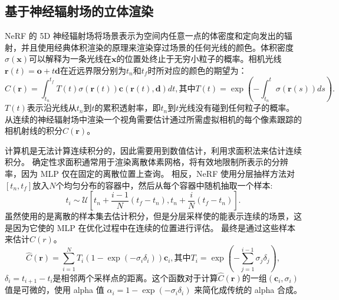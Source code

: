 \subsection{基于神经辐射场的立体渲染}
NeRF 的 5D 神经辐射场将场景表示为空间内任意一点的体密度和定向发出的辐射，并且使用经典体积渲染的原理来渲染穿过场景的任何光线的颜色。体积密度$\displaystyle \sigma \left(\symbf{x} \right)$可以解释为一条光线在$\displaystyle \symbf{x}$的位置处终止于无穷小粒子的概率。相机光线$\displaystyle \symbf{r}\left(t \right) = \symbf{o} + t \symbf{d}$在近远界限分别为$\displaystyle t_n$和$\displaystyle t_f$时所对应的颜色的期望为：
\begin{equation}
    C \left(\symbf{r} \right) = \int_{t_n}^{t_f}T\left(t\right)\sigma\left(\symbf{r}\left(t\right)\right)\symbf{c}\left(\symbf{r}\left(t\right), \symbf{d}\right)dt, 
    \mbox{其中}T\left(t\right) = \exp \left(-\int_{t_n}^{t}\sigma\left(\symbf{r}\left(s\right)\right)ds\right).
\end{equation}
$\displaystyle T\left(t\right)$表示沿光线从$t_n$到$t$的累积透射率，即$t_n$到$t$光线没有碰到任何粒子的概率。从连续的神经辐射场中渲染一个视角需要估计通过所需虚拟相机的每个像素跟踪的相机射线的积分$\displaystyle C\left(\symbf{r}\right)$。

计算机是无法计算连续积分的，因此需要用到数值估计，利用求面积法来估计连续积分。 确定性求面积通常用于渲染离散体素网格，将有效地限制所表示的分辨率，因为 MLP 仅在固定的离散位置上查询。 相反，NeRF 使用分层抽样方法对$\displaystyle \left[t_n, t_f\right]$放入$N$个均匀分布的容器中，然后从每个容器中随机抽取一个样本:
\begin{equation}
    t_i \sim \mathcal{U} \left[t_n + \frac{i - 1}{N}\left(t_f - t_n\right), t_n + \frac{i}{N}\left(t_f - t_n\right) \right].
    \label{eq:uniform}
\end{equation}
虽然使用的是离散的样本集去估计积分，但是分层采样使的能表示连续的场景，这是因为它使的 MLP 在优化过程中在连续的位置进行评估。 最终是通过这些样本来估计$C(r)$。
\begin{equation}
    \hat{C}\left(\symbf{r}\right)=\sum_{i=1}^{N}T_i\left(1-\exp\left(-\sigma_i\delta_i\right)\right)\symbf{c}_i, \mbox{其中}T_i=\exp\left(-\sum_{j=1}^{i-1}\sigma_j\delta_j \right),
    \label{eq:getcolor}
\end{equation}
$\displaystyle \delta_i = t_{i + 1} - t_i$是相邻两个采样点的距离。这个函数对于计算$\displaystyle \hat{C}\left(\symbf{r}\right)$的一组$\displaystyle \left(\symbf{c}_i, \sigma_i\right)$值是可微的，使用 alpha 值 $\displaystyle \alpha_i = 1 - \exp \left(-\sigma_i\delta_i\right)$ 来简化成传统的 alpha 合成。 

